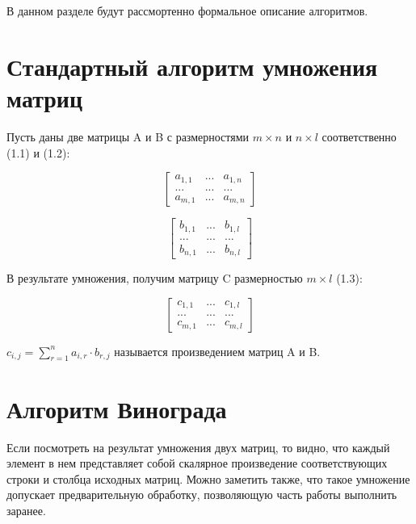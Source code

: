 \documentclass[12pt,a4paper]{report}
\begin{document}
В данном разделе будут рассмортенно формальное описание алгоритмов.

\section{Стандартный алгоритм умножения матриц}

Пусть даны две матрицы A и B с размерностями $m\times n$ и $n\times l$ соответственно (1.1) и (1.2):

\begin{equation}
    \begin{bmatrix} 
        a_{1,1}      & \textrm{...} & a_{1,n} \\
        \textrm{...} & \textrm{...} & \textrm{...} \\
        a_{m,1}      & \textrm{...} & a_{m,n}
    \end{bmatrix}
\end{equation}

\begin{equation}
    \begin{bmatrix} 
        b_{1,1}      & \textrm{...} & b_{1,l} \\
        \textrm{...} & \textrm{...} & \textrm{...} \\
        b_{n,1}      & \textrm{...} & b_{n,l}
    \end{bmatrix}
\end{equation}


В результате умножения, получим матрицу C размерностью $m\times l$ (1.3):

\begin{equation}
    \begin{bmatrix} 
        c_{1,1}      & \textrm{...} & c_{1,l} \\
        \textrm{...} & \textrm{...} & \textrm{...} \\
        c_{m,1}      & \textrm{...} & c_{m,l}
    \end{bmatrix}
\end{equation}

$c_{i,j}=\sum\limits_{r=1}^n a_{i,r} \cdot b_{r,j}$ называется произведением матриц A и B.

\section{Алгоритм Винограда}

Если посмотреть на результат умножения двух матриц, то видно, что каждый элемент в нем представляет 
собой скалярное произведение соответствующих строки и столбца исходных матриц. 
Можно заметить также, что такое умножение допускает предварительную обработку, позволяющую часть работы 
выполнить заранее. \\
\end{document}
